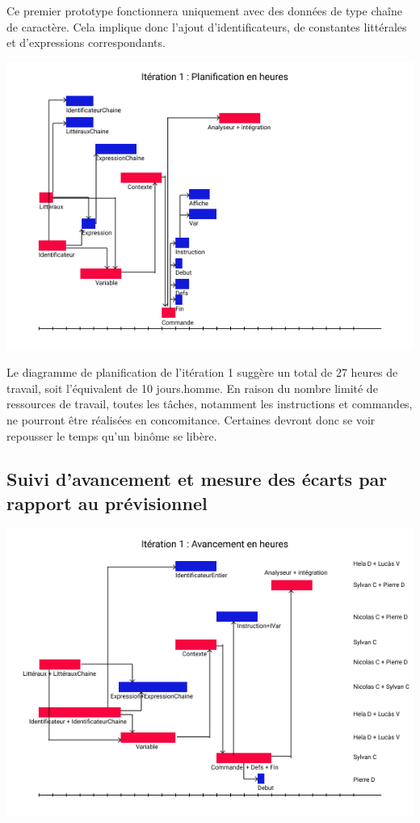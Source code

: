 Ce premier prototype fonctionnera uniquement avec des données de type chaîne
de caractère. Cela implique donc l'ajout d'identificateurs, de constantes
littérales et d'expressions correspondants.

\includegraphics[scale=0.75]{fichiers/planification/iteration1/iteration1Planif.png}

Le diagramme de planification de l'itération 1 suggère un total de 27 heures de
travail, soit l'équivalent de 10 jours.homme. En raison du nombre limité de
ressources de travail, toutes les tâches, notamment les instructions et commandes,
ne pourront être réalisées en concomitance. Certaines devront donc se voir
repousser le temps qu'un binôme se libère.



\subsection{Suivi d’avancement et mesure des écarts par rapport au prévisionnel}

\includegraphics[scale=0.75]{fichiers/planification/iteration1/iteration1Avancement.png}

